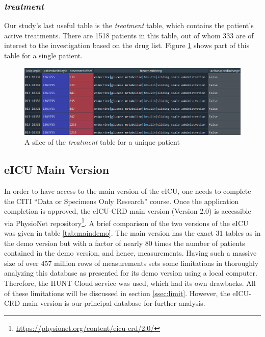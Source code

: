 \subsubsection{\textit{treatment}}
Our study's last useful table is the \textit{treatment} table, which contains the patient's active treatments. There are 1518 patients in this table, out of whom 333 are of interest to the investigation based on the drug list. Figure \ref{fig:treatment} shows part of this table for a single patient.

\begin{figure}[ht]
\centering
\includegraphics[width=15cm]{fig/chapter3/treatment_m.png}
\caption{A slice of the \textit{treatment} table for a unique patient}
\label{fig:treatment}
\end{figure}

\subsection{eICU Main Version}
In order to have access to the main version of the \acrshort{eICU}, one needs to complete the \acrshort{CITI} “Data or Specimens Only Research” course. Once the application completion is approved, the \acrshort{eICU-CRD} main version (Version 2.0) is accessible via PhysioNet repository\footnote{\href{https://physionet.org/content/eicu-crd/2.0/}{https://physionet.org/content/eicu-crd/2.0/}}. A brief comparison of the two versions of the \acrshort{eICU} was given in table \ref{tab:maindemo}. The main version has the exact 31 tables as in the demo version but with a factor of nearly 80 times the number of patients contained in the demo version, and hence, measurements. Having such a massive size of over 457 million rows of measurements sets some limitations in thoroughly analyzing this database as presented for its demo version using a local computer. Therefore, the \acrfull{HUNT} Cloud service was used, which had its own drawbacks. All of these limitations will be discussed in section \ref{ssec:limit}. However, the \acrshort{eICU-CRD} main version is our principal database for further analysis. 

